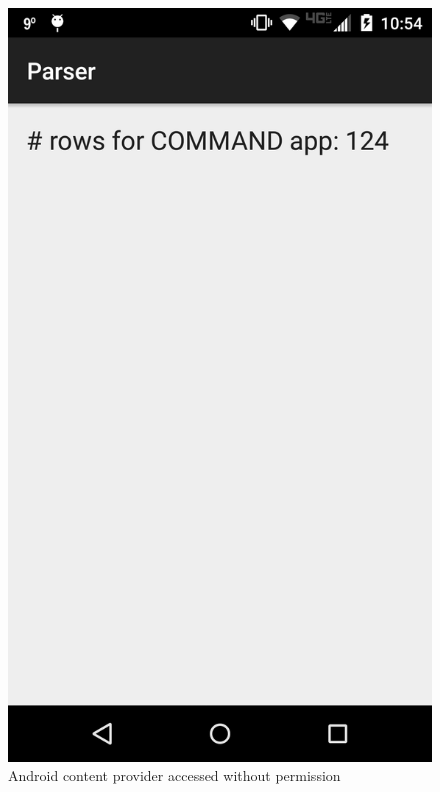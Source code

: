 \begin{figure}
\begin{minipage}{.45\columnwidth}
	\includegraphics[width=\columnwidth,scale=0.5]{images/neitherHavePerm}
	\caption{Android content provider accessed without permission}
	\label{fig:neitherHavePerm}
\end{minipage}
\end{figure}

